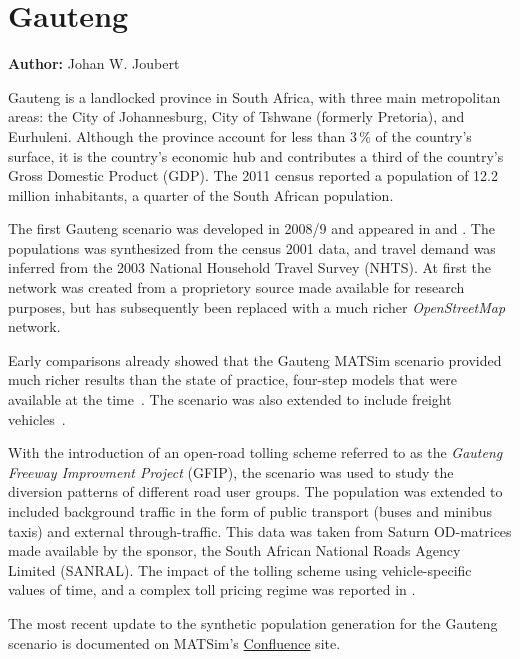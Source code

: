 \section{Gauteng}
\label{sec:gauteng}
\hfill \textbf{Author:} Johan W. Joubert

Gauteng is a landlocked province in South Africa, with  three main metropolitan areas: the City of Johannesburg, City of Tshwane (formerly Pretoria), and Eurhuleni. Although the province account for less than 3\,\% of the country's surface, it is the country's economic hub and contributes a third of the country's Gross Domestic Product (GDP). The 2011 census reported a population of 12.2\,million inhabitants, a quarter of the South African population. 

The first Gauteng scenario was developed in 2008/9 and appeared in \citet[][]{Fourie2009MastersThesis} and \citet[][]{FourieJoubert_SATC_2009}. The populations was synthesized from the census 2001 data, and travel demand was inferred from the 2003 National Household Travel Survey (NHTS). At first the network was created from a proprietory source made available for research purposes, but has subsequently been replaced with a much richer \emph{OpenStreetMap} network.

Early comparisons already showed that the Gauteng MATSim scenario provided much richer results than the state of practice, four-step models that were available at the time~\citep[][]{Fourie_SATC_2010}. The scenario was also extended to include freight vehicles~\citep[][]{JoubertJEtAl_TRR_2010}.

With the introduction of an open-road tolling scheme referred to as the \emph{Gauteng Freeway Improvment Project} (GFIP), the scenario was used to study the diversion patterns of different road user groups. The population was extended to included background traffic in the form of public transport (buses and minibus taxis) and external through-traffic. This data was taken from Saturn OD-matrices made available by the sponsor, the South African National Roads Agency Limited (SANRAL). The impact of the tolling scheme using vehicle-specific values of time, and a complex toll pricing regime was reported in \citet[][]{NagelKickhoeferJoubert2014HeterogeneousVoTsPROCEDIA}.

The most recent update to the synthetic population generation for the Gauteng scenario is documented on MATSim's \href{https://matsim.atlassian.net/wiki/display/MATPUB/South+Africa}{Confluence} site.

